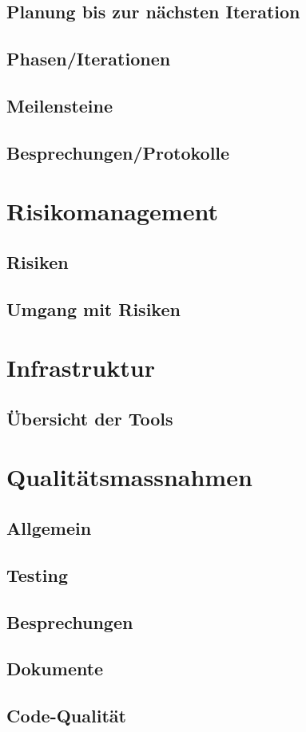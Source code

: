 \documentclass[
	ngerman,
	toc=listof, %
	toc=bibliography, %
	footnotes=multiple, %
	parskip=half, %
	numbers=noendperiod %
]{scrartcl}
\begin{document}
	\subsection{Planung bis zur nächsten Iteration}

	\subsection{Phasen/Iterationen}

	\subsection{Meilensteine}

	\subsection{Besprechungen/Protokolle}

\section{Risikomanagement}
	\subsection{Risiken}

	\subsection{Umgang mit Risiken}

\section{Infrastruktur}
	\subsection{Übersicht der Tools}

\section{Qualitätsmassnahmen}
	\subsection{Allgemein}

	\subsection{Testing}

	\subsection{Besprechungen}

	\subsection{Dokumente}

	\subsection{Code-Qualität}
\end{document}

